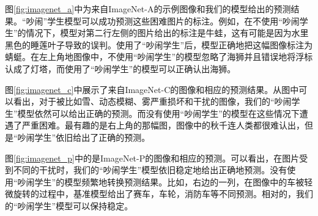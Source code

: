 \documentclass[10pt]{article}
\begin{document}
图\ref{fig:imagenet_a}中为来自ImageNet-A的示例图像和我们的模型给出的预测结果。“吵闹”学生模型可以成功预测这些困难图片的标注。例如，在不使用“吵闹学生”的情况下，模型对第二行左侧的图片给出的标注是牛蛙，这有可能是因为水里黑色的睡莲叶子导致的误判。使用了“吵闹学生”后，模型正确地把这幅图像标注为蜻蜓。在左上角地图像中，不使用“吵闹学生”的模型忽略了海狮并且错误地将浮标认成了灯塔，而使用了“吵闹学生”的模型可以正确认出海狮。  


图\ref{fig:imagenet_c}中展示了来自ImageNet-C的图像和相应的预测结果。从图中可以看出，对于被比如雪、动态模糊、雾严重损坏和干扰的图像，我们的“吵闹学生”模型依然可以给出正确的预测。而没有使用“吵闹学生”的模型在这些情况下遭遇了严重困难。最有趣的是右上角的那幅图，图像中的秋千连人类都很难认出，但是“吵闹学生”依旧给出了正确的预测。  


图\ref{fig:imagenet_p}中的是ImageNet-P的图像和相应的预测。可以看出，在图片受到不同的干扰时，我们的“吵闹学生”模型依旧稳定地给出正确地预测。没有使用“吵闹学生”的模型频繁地转换预测结果。比如，右边的一列，在图像中的车被轻微旋转的过程中，基准模型给出了赛车，车轮，消防车等不同预测。相对的，我们的“吵闹学生”模型可以保持稳定。  
\end{document}
